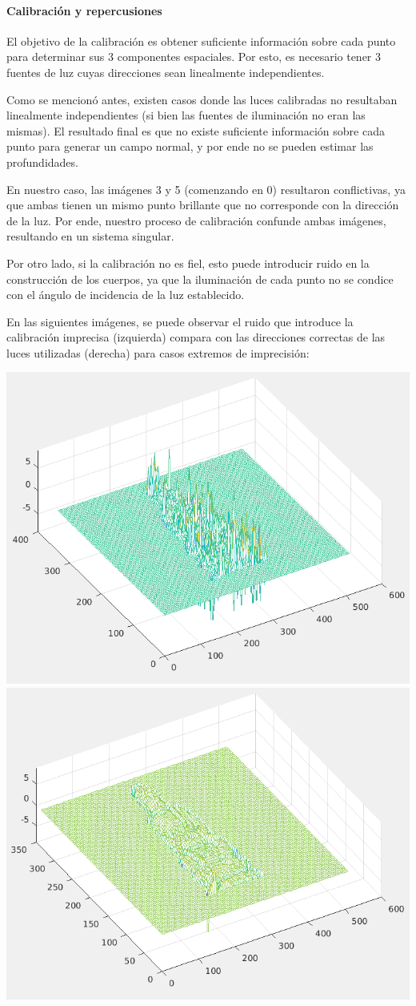\paragraph{Calibración y repercusiones}

El objetivo de la calibración es obtener suficiente información sobre cada punto
para determinar sus 3 componentes espaciales. Por esto, es necesario tener 3
fuentes de luz cuyas direcciones sean linealmente independientes.

Como se mencionó antes, existen casos donde las luces calibradas no resultaban
linealmente independientes (si bien las fuentes de iluminación no eran las mismas).
El resultado final es que no existe suficiente información sobre cada punto
para generar un campo normal, y por ende no se pueden estimar las profundidades.

En nuestro caso, las imágenes 3 y 5 (comenzando en 0) resultaron conflictivas,
ya que ambas tienen un mismo punto brillante que no corresponde con la dirección
de la luz. Por ende, nuestro proceso de calibración confunde ambas imágenes,
resultando en un sistema singular.

Por otro lado, si la calibración no es fiel, esto puede introducir ruido en
la construcción de los cuerpos, ya que la iluminación de cada punto no
se condice con el ángulo de incidencia de la luz establecido.

En las siguientes imágenes, se puede observar el ruido que introduce la calibración
imprecisa (izquierda) compara con las direcciones correctas de las luces utilizadas
(derecha) para casos extremos de imprecisión:

\begin{center}
\includegraphics[width=.4\linewidth]{imagenes/calib-ruido.png}
\includegraphics[width=.4\linewidth]{imagenes/luces-limpio.png}
\end{center}

